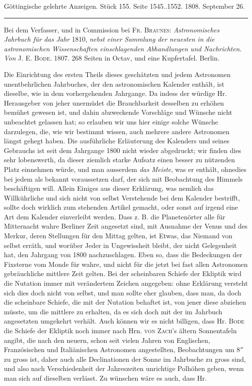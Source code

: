 \clearpage
{}
\begin{center}\small Göttingische gelehrte Anzeigen. Stück 155. Seite 1545..1552. 1808. September 26.\\[3pt]\rule{.72\linewidth}{.3pt}\end{center}

Bei dem Verfasser, und in Commission bei \textsc{Fr. Braunes}: \emph{Astronomisches Jahrbuch für das Jahr} 1810, \emph{nebst einer Sammlung der neuesten in die astronomischen Wissenschaften einschlagenden Abhandlungen und Nachrichten. Von} \textsc{J. E. Bode}. 1807. 268 Seiten in Octav, und eine Kupfertafel. Berlin.

Die Einrichtung des ersten Theils dieses geschätzten und jedem Astronomen unentbehrlichen Jahrbuches, der den astronomischen Kalender enthält, ist dieselbe, wie in dem vorhergehenden Jahrgange. Da indess der würdige Hr. Herausgeber von jeher unermüdet die Brauchbarkeit desselben zu erhöhen bemühet gewesen ist, und dahin abzweckende Vorschläge und Wünsche nicht unbeachtet gelassen hat; so erlauben wir uns hier einige solche Wünsche darzulegen, die, wie wir bestimmt wissen, auch mehrere andere Astronomen längst gehegt haben. Die ausführliche Erläuterung des Kalenders und seines Gebrauchs ist seit dem Jahrgange 1800 nicht wieder abgedruckt; wir finden dies sehr lobenswerth, da dieser ziemlich starke Aufsatz einen besser zu nützenden Platz einnehmen würde, und man ausserdem \emph{das Meiste}, was er enthält, ohnedies bei jedem als bekannt voraussetzen darf, der sich mit Beobachtung des Himmels beschäftigen will. Allein Einiges aus dieser Erklärung, was nemlich das Willkührliche und sich nicht von selbst Verstehende bei dem Kalender bestrifft, sollte doch wirklich zum stehenden Artikel gemacht, oder sonst auf irgend eine Art dem Kalender einverleibt werden. Dass z. B. die Planetenörter alle für Mitternacht wahre Berliner Zeit angesetzt sind, mit Ausnahme der Venus und des Merkur, deren Stellungen für den Mittag gelten, ist Etwas, das Niemand von selbst erräth, und worüber Jeder in Ungewissheit bleibt, der nicht Gelegenheit hat, den Jahrgang von 1800 nachzuschlagen. Eben so, dass die Bedeckungen der Fixsterne vom Monde für wahre, und nicht für die jetzt bei fast allen Astronomen gebräuchliche mittlere Zeit gelten. Bei der scheinbaren Schiefe der Ekliptik wird die Nutation immer mit verändertem Zeichen angegeben: ohne Erklärung versteht sich dies doch nicht von selbst, und man sollte eher glauben, dass man, da doch die scheinbare Schiefe, die mit der Nutation behaftet ist, von jener diese abziehen müsste, um die mittlere zu erhalten, da es sich doch mit der im Jahrbuch angesetzten umgekehrt verhält. Auch können wir es nicht billigen, dass Hr. \textsc{Bode} die Schiefe der Ekliptik noch immer nach Hrn. \textsc{von Zach}'s ältern Sonnentafeln angibt, die nach den neuern, schon seit vielen Jahren von Englischen, Französischen und Italiänischen Astronomen angestellten, Beobachtungen um $8''$ zu gross ist, daher auch alle Declinationen der Sonne im Jahrbuche zu gross sind, und also nach Verschiedenheit der Jahreszeiten unrichtige Polhöhen geben, wenn man sich auf dieselben verlässt. Zu wünschen wäre es auch, dass Hr. 